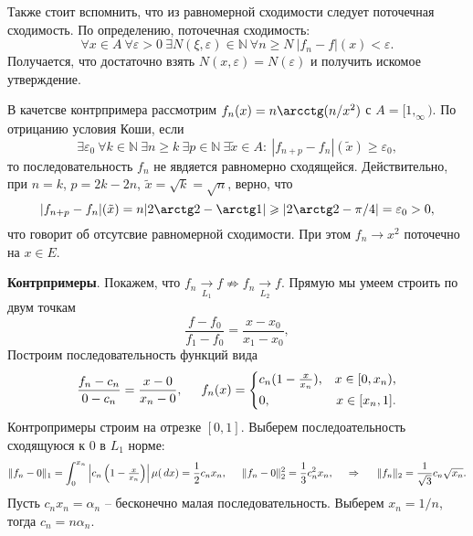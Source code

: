 Также стоит вспомнить, что из равномерной сходимости следует поточечная сходимость. По определению, поточечная сходимость:
\begin{equation*}
    \forall x \in A \ 
    \forall \varepsilon > 0 \ 
    \exists N(\xi, \varepsilon) \in \mathbb{N} \ 
    \forall n \geq N \ 
    |f_n-f|(x) < \varepsilon.
\end{equation*}
Получается, что достаточно взять $N(x, \varepsilon) = N(\varepsilon)$ и получить искомое утверждение. 

В качетсве контрпримера рассмотрим $f_n(x) = n \arcctg(n/x^2)$ с $A = [1, _\infty)$. По отрицанию условия Коши, если
\begin{equation*}
    \exists \varepsilon_0 \ 
    \forall k \in \mathbb{N} \ 
    \exists n \geq k \ 
    \exists p \in \mathbb{N} \
    \exists \tilde{x} \in A \colon \ 
    |f_{n+p}-f_n|(\tilde{x}) \geq \varepsilon_0,
\end{equation*}
то последовательность $f_n$ не явдяется равномерно сходящейся. Действительно,
при $n=k$, $p=2k-2n$, $\tilde{x} = \sqrt{k} = \sqrt{n}$, верно, что
\begin{equation*}
    |f_{n+p}-f_n|(\tilde{x}) = n|2\arctg 2 - \arctg 1| \geq |2 \arctg 2 - \pi/4| = \varepsilon_0 > 0,
\end{equation*}
что говорит об отсутсвие равномерной сходимости. При этом $f_n \to x^2$ поточечно на $x \in E$. 

\textbf{Контрпримеры}. Покажем, что $f_n \underset{L_1}{\to} f \not \Rightarrow f_n \underset{L_2}{\to} f$. Прямую мы умеем строить по двум точкам
\begin{equation*}
    \frac{f-f_0}{f_1-f_0} = \frac{x-x_0}{x_1-x_0},
\end{equation*}
Построим последовательность функций вида
\begin{equation*}
    \frac{f_n - c_n}{0-c_n} = \frac{x-0}{x_n-0},
    \hspace{5 mm} 
    f_n(x) = \left\{\begin{aligned}
        &c_n(1-\textstyle \frac{x}{x_n}), &x\in[0, x_n), \\
        &0, &x\in[x_n, 1].
    \end{aligned}\right.
\end{equation*}
Контропримеры строим на отрезке $[0, 1]$. Выберем последоательность сходящуюся к $0$ в $L_1$ норме:
\begin{equation*}
    \|f_n - 0\|_1 = \int_0^{x_n} \left| 
        c_n\left(1- \textstyle\frac{x}{x_n}\right)
    \right| \mu(\, d x) = \frac{1}{2} c_n x_n,
    \hspace{5 mm} 
    \|f_n - 0\|_2^2 = \frac{1}{3} c_n^2 x_n,
    \hspace{0.5cm} \Rightarrow \hspace{0.5cm}
    \|f_n\|_2 = \frac{1}{\sqrt{3}} c_n \sqrt{x_n}.
\end{equation*}
Пусть $c_n x_n = \alpha_n$ -- бесконечно малая последовательность. Выберем $x_n = 1/n$, тогда $c_n = n \alpha_n$. 

